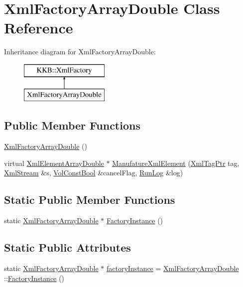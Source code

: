 \hypertarget{class_xml_factory_array_double}{}\section{Xml\+Factory\+Array\+Double Class Reference}
\label{class_xml_factory_array_double}
Inheritance diagram for Xml\+Factory\+Array\+Double\+:\begin{figure}[H]
\begin{center}
\leavevmode
\includegraphics[height=2.000000cm]{class_xml_factory_array_double}
\end{center}
\end{figure}
\subsection*{Public Member Functions}
\begin{DoxyCompactItemize}
\item 
\hyperlink{class_xml_factory_array_double_a18827bce1d7e905331f558f7c2f8704c}{Xml\+Factory\+Array\+Double} ()
\item 
virtual \hyperlink{class_k_k_b_1_1_xml_element_array_double}{Xml\+Element\+Array\+Double} $\ast$ \hyperlink{class_xml_factory_array_double_a1acb0e7f34f0ed7bd45633ec670dbbb0}{Manufature\+Xml\+Element} (\hyperlink{namespace_k_k_b_a9253a3ea8a5da18ca82be4ca2b390ef0}{Xml\+Tag\+Ptr} tag, \hyperlink{class_k_k_b_1_1_xml_stream}{Xml\+Stream} \&s, \hyperlink{namespace_k_k_b_a7d390f568e2831fb76b86b56c87bf92f}{Vol\+Const\+Bool} \&cancel\+Flag, \hyperlink{class_k_k_b_1_1_run_log}{Run\+Log} \&log)
\end{DoxyCompactItemize}
\subsection*{Static Public Member Functions}
\begin{DoxyCompactItemize}
\item 
static \hyperlink{class_xml_factory_array_double}{Xml\+Factory\+Array\+Double} $\ast$ \hyperlink{class_xml_factory_array_double_a9f5f0a45e156fefb87ce9c5e882f07eb}{Factory\+Instance} ()
\end{DoxyCompactItemize}
\subsection*{Static Public Attributes}
\begin{DoxyCompactItemize}
\item 
static \hyperlink{class_xml_factory_array_double}{Xml\+Factory\+Array\+Double} $\ast$ \hyperlink{class_xml_factory_array_double_a690669c2143571c754643d57d38e24b0}{factory\+Instance} = \hyperlink{class_xml_factory_array_double}{Xml\+Factory\+Array\+Double} \+::\hyperlink{class_xml_factory_array_double_a9f5f0a45e156fefb87ce9c5e882f07eb}{Factory\+Instance} ()
\end{DoxyCompactItemize}


